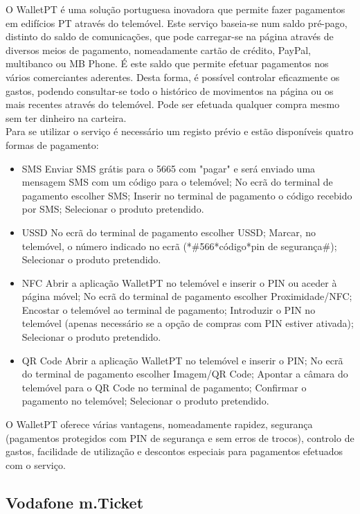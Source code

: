 O WalletPT é uma solução portuguesa inovadora que permite fazer pagamentos em edifícios PT através do telemóvel. Este serviço baseia-se num saldo pré-pago, distinto do saldo de comunicações, que pode carregar-se na página \web através de diversos meios de pagamento, nomeadamente cartão de crédito, PayPal, multibanco ou MB Phone. É este saldo que permite efetuar pagamentos nos vários comerciantes aderentes. Desta forma, é possível controlar eficazmente os gastos, podendo consultar-se todo o histórico de movimentos na página \web ou os mais recentes através do telemóvel. Pode ser efetuada qualquer compra mesmo sem ter dinheiro na carteira.
\\Para se utilizar o serviço é necessário um registo prévio e estão disponíveis quatro formas de pagamento:
\begin{itemize}
\item SMS
\subitem Enviar SMS grátis para o 5665 com "pagar" e será enviado uma mensagem SMS com um código para o telemóvel;
\subitem No ecrã do terminal de pagamento escolher SMS;
\subitem Inserir no terminal de pagamento o código recebido por SMS;
\subitem Selecionar o produto pretendido.
\item USSD
\subitem No ecrã do terminal de pagamento escolher USSD;
\subitem Marcar, no telemóvel, o número indicado no ecrã (*\#566*código*pin de segurança\#);
\subitem Selecionar o produto pretendido.
\item NFC
\subitem Abrir a aplicação WalletPT no telemóvel e inserir o PIN ou aceder à página \web móvel;
\subitem No ecrã do terminal de pagamento escolher Proximidade/NFC;
\subitem Encostar o telemóvel ao terminal de pagamento;
\subitem Introduzir o PIN no telemóvel (apenas necessário se a opção de compras com PIN estiver ativada);
\subitem Selecionar o produto pretendido.
\item QR Code
\subitem Abrir a aplicação WalletPT no telemóvel e inserir o PIN;
\subitem No ecrã do terminal de pagamento escolher Imagem/QR Code;
\subitem Apontar a câmara do telemóvel para o QR Code no terminal de pagamento;
\subitem Confirmar o pagamento no telemóvel;
\subitem Selecionar o produto pretendido.
\end{itemize}
O WalletPT oferece várias vantagens, nomeadamente rapidez, segurança (pagamentos protegidos com PIN de segurança e sem erros de trocos), controlo de gastos, facilidade de utilização e descontos especiais para pagamentos efetuados com o serviço.\cite{walletpt}

\subsection{Vodafone m.Ticket}

